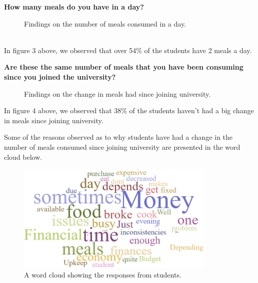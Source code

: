 \documentclass{article}
\begin{document}
\noindent
\textbf{How many meals do you have in a day?}
\begin{figure}[h]
    \centering
\caption{Findings on the number of meals consumed in a day.}
\end{figure}
\\
In figure 3 above, we observed that over 54\% of the students have 2 meals a day.

\vspace{20pt}

\noindent
\textbf{Are these the same number of meals that you have been consuming since you joined the university?}
\begin{figure}[h]
    \centering
\caption{Findings on the change in meals had since joining university.}
\end{figure}

In figure 4 above, we observed that 38\% of the students haven't had a big change in meals since joining university.

\vspace{30pt}

\noindent
Some of the reasons observed as to why students have had a change in the number of meals consumed since joining university are presented in the word cloud below.

\newpage
\begin{figure}[h]
  \centering
  \includegraphics[width=360px]{images/wordcloud1.PNG}
  \caption{A word cloud showing the responses from students.}
\end{figure}
\end{document}
